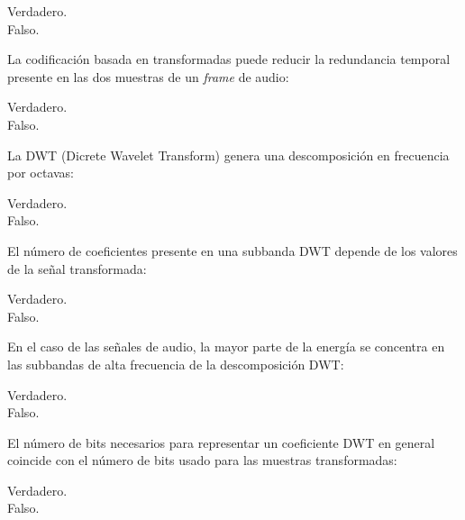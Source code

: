 \documentclass[legalpaper, 12pt, addpoints]{exam}
\begin{document}
\begin{questions}
\begin{oneparchoices}
  \choice Verdadero.\\
  \choice Falso.
\end{oneparchoices}
  
\vspace{0.10in}

\question La codificación basada en transformadas puede reducir la
redundancia temporal presente en las dos muestras de un \emph{frame}
de audio:

\begin{oneparchoices}
  \choice Verdadero.\\
  \choice Falso.
\end{oneparchoices}
  
\vspace{0.10in}

\question La DWT (Dicrete Wavelet Transform) genera una descomposición
en frecuencia por octavas:

\begin{oneparchoices}
  \choice Verdadero.\\
  \choice Falso.
\end{oneparchoices}
  
\vspace{0.10in}

\question El número de coeficientes presente en una subbanda DWT
depende de los valores de la señal transformada:

\begin{oneparchoices}
  \choice Verdadero.\\
  \choice Falso.
\end{oneparchoices}
  
\vspace{0.10in}

\question En el caso de las señales de audio, la mayor parte de la
energía se concentra en las subbandas de alta frecuencia de la
descomposición DWT:

\begin{oneparchoices}
  \choice Verdadero.\\
  \choice Falso.
\end{oneparchoices}
  
\vspace{0.10in}

\question El número de bits necesarios para representar un coeficiente
DWT en general coincide con el número de bits usado para las muestras
transformadas:

\begin{oneparchoices}
  \choice Verdadero.\\
  \choice Falso.
\end{oneparchoices}
  

\end{questions}
\end{document}
